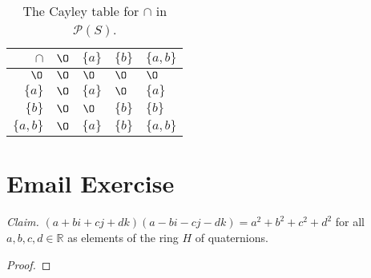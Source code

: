 \documentclass{abrice}
\newcommand{\R}{\mathbb{R}}
\renewcommand{\P}{\mathscr{P}}
\begin{document}
\begin{table}
  \centering
  \begin{tabular}{r|llll}
    $\cap$ & $\O$ & $\{a\}$ & $\{b\}$ & $\{a,b\}$ \\
    \midrule
    $\O$ & $\O$ & $\O$ & $\O$ & $\O$ \\
    $\{a\}$ & $\O$ & $\{a\}$ & $\O$ & $\{a\}$ \\
    $\{b\}$ & $\O$ & $\O$ & $\{b\}$ & $\{b\}$ \\
    $\{a,b\}$ & $\O$ & $\{a\}$ & $\{b\}$ & $\{a,b\}$
  \end{tabular}
  \caption{The Cayley table for $\cap$ in $\P(S)$.}
  \label{tab:29b2}
\end{table}

\section{Email Exercise}

\emph{Claim.} $(a + bi + cj + dk)(a - bi - cj -dk) = a^2 + b^2 + c^2 + d^2$ for
all $a,b,c,d \in \R$ as elements of the ring $H$ of quaternions.

\begin{proof}

\end{proof}
\end{document}
